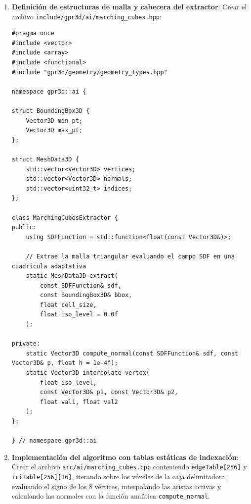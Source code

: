 \documentclass[11pt,a4paper]{article}
\begin{document}
\begin{enumerate}
    \item \textbf{Definici{\'o}n de estructuras de malla y cabecera del extractor}:
    Crear el archivo \texttt{include/gpr3d/ai/marching\_cubes.hpp}:
\begin{verbatim}
#pragma once
#include <vector>
#include <array>
#include <functional>
#include "gpr3d/geometry/geometry_types.hpp"

namespace gpr3d::ai {

struct BoundingBox3D {
    Vector3D min_pt;
    Vector3D max_pt;
};

struct MeshData3D {
    std::vector<Vector3D> vertices;
    std::vector<Vector3D> normals;
    std::vector<uint32_t> indices;
};

class MarchingCubesExtractor {
public:
    using SDFFunction = std::function<float(const Vector3D&)>;

    // Extrae la malla triangular evaluando el campo SDF en una cuadricula adaptativa
    static MeshData3D extract(
        const SDFFunction& sdf,
        const BoundingBox3D& bbox,
        float cell_size,
        float iso_level = 0.0f
    );

private:
    static Vector3D compute_normal(const SDFFunction& sdf, const Vector3D& p, float h = 1e-4f);
    static Vector3D interpolate_vertex(
        float iso_level,
        const Vector3D& p1, const Vector3D& p2,
        float val1, float val2
    );
};

} // namespace gpr3d::ai
\end{verbatim}

    \item \textbf{Implementaci{\'o}n del algoritmo con tablas est{\'a}ticas de indexaci{\'o}n}:
    Crear el archivo \texttt{src/ai/marching\_cubes.cpp} conteniendo \texttt{edgeTable[256]} y \texttt{triTable[256][16]}, iterando sobre los v{\'o}xeles de la caja delimitadora, evaluando el signo de los 8 v{\'e}rtices, interpolando las aristas activas y calculando las normales con la funci{\'o}n anal{\'\i}tica \texttt{compute\_normal}.
\end{enumerate}
\end{document}

